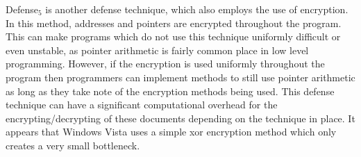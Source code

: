 \documentclass[11pt]{amsart}
\begin{document}
Defense$_5$ is another defense technique, which also employs the use of encryption.  In this method, addresses and pointers are encrypted throughout the program.  This can make programs which do not use this technique uniformly difficult or even unstable, as pointer arithmetic is fairly common place in low level programming.  However, if the encryption is used uniformly throughout the program then programmers can implement methods to still use pointer arithmetic as long as they take note of the encryption methods being used.  This defense technique can have a significant computational overhead for the encrypting/decrypting of these documents depending on the technique in place.  It appears that Windows Vista uses a simple xor encryption method which only creates a very small bottleneck.
\end{document}
